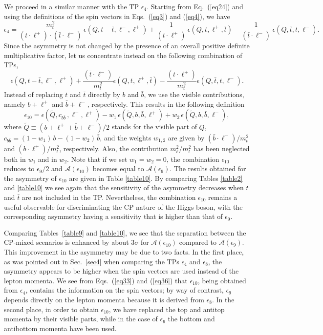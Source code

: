 \documentclass[aps,preprint,tightenlines,floatfix,superscriptaddress,nofootinbib,showpacs]{revtex4-1}
\def\beq{\begin{equation}}
\def\eeq{\end{equation}}
\def\tbar{\bar{t}}
\def\bbar{\bar{b}}
\begin{document}
We proceed in a similar manner with the TP $\epsilon_4$. Starting from
Eq.~(\ref{eq24}) and using the definitions of the spin vectors
in Eqs.~(\ref{eq3}) and (\ref{eq4}), we have
%
\beq
\label{eq34}
\epsilon_4 = \frac{m^2_t}{(t\cdot\ell^+)\cdot(\tbar\cdot\ell^-)}\,\epsilon(Q,t-\tbar,\ell^-,\ell^+)+\frac{1}{(t\cdot\ell^+)}\,\epsilon(Q,t,\ell^+,\tbar)-\frac{1}{(\tbar\cdot \ell^-)}\,\epsilon(Q,\tbar,t,\ell^-).
\eeq
%
Since the asymmetry is not changed by the presence
of an overall positive definite multiplicative
factor, let us concentrate instead on the following combination
of TPs,
%
\beq
\label{eq35}
\epsilon(Q,t-\tbar,\ell^-,\ell^+)+\frac{(\tbar\cdot \ell^-)}{m^2_t}\epsilon(Q,t,\ell^+,\tbar)-\frac{(t\cdot\ell^+)}{m^2_t}\epsilon(Q,\tbar,t,\ell^-).
\eeq
Instead of replacing $t$ and $\tbar$ directly by $b$ and $\bbar$,
we use the visible contributions, namely $b+\ell^+$ and $\bbar +\ell^-$,
respectively. This results in the following definition
%
\beq
\label{eq36}
\epsilon_{10}=\epsilon(\tilde{Q},c_{b\bbar}\,,\ell^-,\ell^+)-w_1\,\epsilon(\tilde{Q},b,\bbar,\ell^+)+w_2\,\epsilon(\tilde{Q},b,\bbar,\ell^-),
\eeq
%
where $\tilde{Q}\equiv (b+\ell^+\!+\bbar +\ell^-)/2$ stands for the
visible part of $Q$, $c_{b\bbar}=(1-w_1)\,b-(1-w_2)\,\bbar$, and the
weights $w_{1,2}$ are given by $(\bbar\cdot \ell^-)/m^2_t $ and
$(b\cdot \ell^+)/m^2_t$, respectively. Also, the contribution
$m^2_{\ell}/m^2_t$ has been neglected both in $w_1$ and in $w_2$. Note
that if we set $w_1=w_2=0$, the combination $\epsilon_{10}$ reduces to
$\epsilon_9 /2$ and $\mathcal{A}(\epsilon_{10})$ becomes equal to
$\mathcal{A}(\epsilon_9)$. The results obtained for the asymmetry of
$\epsilon_{10}$ are given in Table \ref{table10}. By comparing Tables
\ref{table2} and \ref{table10} we see again that the sensitivity of
the asymmetry decreases when $t$ and $\tbar$ are not included in the
TP. Nevertheless, the combination $\epsilon_{10}$ remains a useful
observable for discriminating the $\mathrm{CP}$ nature of the Higgs
boson, with the corresponding asymmetry having a sensitivity that is
higher than that of $\epsilon_9$.

Comparing
Tables~\ref{table9} and \ref{table10}, we see that the
separation between the $\mathrm{CP}$-mixed scenarios is enhanced by
about $3\sigma$ for $\mathcal{A}(\epsilon_{10})$ compared
  to $\mathcal{A}(\epsilon_{9})$.
    This improvement in the asymmetry may be due to two facts. In the first
place, as was pointed out in Sec.~\ref{sec4} when comparing the TPs
$\epsilon_4$ and $\epsilon_8$, the asymmetry appears to be higher when
the spin vectors are used instead of the lepton momenta.  We see
from Eqs.~(\ref{eq33}) and (\ref{eq36}) that $\epsilon_{10}$, being
obtained from $\epsilon_4$, contains the information on the spin
vectors; by way of contrast, $\epsilon_9$ depends directly on the
lepton momenta because it is derived from $\epsilon_8$. In the second
place, in order to obtain $\epsilon_{10}$, we have replaced
the top and antitop momenta by their 
visible parts, while in the case of $\epsilon_9$ the bottom and
antibottom momenta have been used.
\end{document}
